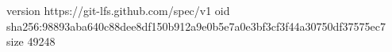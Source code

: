 version https://git-lfs.github.com/spec/v1
oid sha256:98893aba640c88dee8df150b912a9e0b5e7a0e3bf3cf3f44a30750df37575ec7
size 49248

